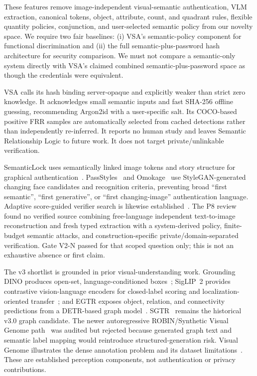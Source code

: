 \documentclass[compsoc,conference,a4paper,10pt,times]{IEEEtran}
\begin{document}
These features remove image-independent visual-semantic authentication, VLM extraction, canonical tokens, object, attribute, count, and quadrant rules, flexible quantity policies, conjunction, and user-selected semantic policy from our novelty space. We require two fair baselines: (i) VSA's semantic-policy component for functional discrimination and (ii) the full semantic-plus-password hash architecture for security comparison. We must not compare a semantic-only system directly with VSA's claimed combined semantic-plus-password space as though the credentials were equivalent.

VSA calls its hash binding server-opaque and explicitly weaker than strict zero knowledge. It acknowledges small semantic inputs and fast SHA-256 offline guessing, recommending Argon2id with a user-specific salt. Its COCO-based positive FRR samples are automatically selected from cached detections rather than independently re-inferred. It reports no human study and leaves Semantic Relationship Logic to future work. It does not target private/unlinkable verification.

SemanticLock uses semantically linked image tokens and story structure for graphical authentication~\cite{Olade2023SemanticLock}. PassStyles~\cite{Matsuzaki2025PassStyles} and Omokage~\cite{Matsuzaki2026Omokage} use StyleGAN-generated changing face candidates and recognition criteria, preventing broad ``first semantic'', ``first generative'', or ``first changing-image'' authentication language. Adaptive score-guided verifier search is likewise established~\cite{MartinezDiaz2011HillClimbing}. The P8 review found no verified source combining free-language independent text-to-image reconstruction and fresh typed extraction with a system-derived policy, finite-budget semantic attacks, and construction-specific private/domain-separated verification. Gate V2-N passed for that scoped question only; this is not an exhaustive absence or first claim.

The v3 shortlist is grounded in prior visual-understanding work. Grounding DINO produces open-set, language-conditioned boxes~\cite{Liu2024GroundingDINO}; SigLIP~2 provides contrastive vision-language encoders for closed-label scoring and localization-oriented transfer~\cite{Tschannen2025SigLIP2}; and EGTR exposes object, relation, and connectivity predictions from a DETR-based graph model~\cite{Im2024EGTR}. SGTR~\cite{Li2022SGTR} remains the historical v3.0 graph candidate. The newer autoregressive ROBIN/Synthetic Visual Genome path~\cite{Park2025SyntheticVG} was audited but rejected because generated graph text and semantic label mapping would reintroduce structured-generation risk. Visual Genome illustrates the dense annotation problem and its dataset limitations~\cite{Krishna2017VisualGenome}. These are established perception components, not authentication or privacy contributions.
\end{document}
